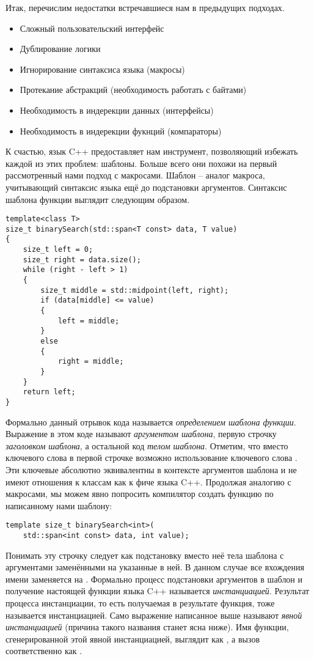 Итак, перечислим недостатки встречавшиеся нам в предыдущих подходах.
\begin{itemize}
\item Сложный пользовательский интерфейс
\item Дублирование логики
\item Игнорирование синтаксиса языка (макросы)
\item Протекание абстракций (необходимость работать с байтами)
\item Необходимость в индерекции данных (интерфейсы)
\item Необходимость в индерекции фукнций (компараторы)
\end{itemize}
К счастью, язык C++ предоставляет нам инструмент, позволяющий избежать каждой из этих проблем: шаблоны. Больше всего они похожи на первый рассмотренный нами подход с макросами. Шаблон -- аналог макроса, учитывающий синтаксис языка ещё до подстановки аргументов. Синтаксис шаблона функции выглядит следующим образом.
\begin{verbatim}
template<class T>
size_t binarySearch(std::span<T const> data, T value)
{
    size_t left = 0;
    size_t right = data.size();
    while (right - left > 1)
    {
        size_t middle = std::midpoint(left, right);
        if (data[middle] <= value)
        {
            left = middle;
        }
        else
        {
            right = middle;
        }
    }
    return left;
}
\end{verbatim}
Формально данный отрывок кода называется \textit{определением шаблона функции}. Выражение  в этом коде называют \textit{аргументом шаблона}, первую строчку \textit{заголовком шаблона}, а остальной код \textit{телом шаблона}. Отметим, что вместо ключевого слова  в первой строчке возможно использование ключевого слова . Эти ключевые абсолютно эквивалентны в контексте аргументов шаблона и не имеют отношения к классам как к фиче языка C++. Продолжая аналогию с макросами, мы можем явно попросить компилятор создать функцию по написанному нами шаблону:
\begin{verbatim}
template size_t binarySearch<int>(
    std::span<int const> data, int value);
\end{verbatim}
Понимать эту строчку следует как подстановку вместо неё тела шаблона с аргументами заменёнными на указанные в ней. В данном случае все вхождения имени  заменяется на . Формально процесс подстановки аргументов в шаблон и получение настоящей функции языка C++ называется \textit{инстанциацией}. Результат процесса инстанциации, то есть получаемая в результате функция, тоже называется инстанциацией. Само выражение написанное выше называют \textit{явной инстанциацией} (причина такого названия станет ясна ниже). Имя функции, сгенерированной этой явной инстанциацией, выглядит как , а вызов соответственно как .

